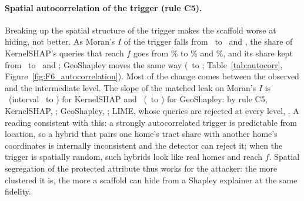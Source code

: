 \paragraph{Spatial autocorrelation of the trigger (rule C5).} Breaking up the spatial structure of the trigger makes
the scaffold worse at hiding, not better. As Moran's $I$ of the trigger falls from \AutoHighMoran\ to
\AutoMidMoran\ and \AutoLowMoran, the share of KernelSHAP's queries that reach $f$ goes from \AutoHighKernelSHAPLeak\%
to \AutoMidKernelSHAPLeak\% and \AutoLowKernelSHAPLeak\%, and its share kept from \AutoHighKernelSHAPKept\ to
\AutoMidKernelSHAPKept\ and \AutoLowKernelSHAPKept; GeoShapley moves the same way (\AutoHighGeoShapleyKept\ to
\AutoLowGeoShapleyKept; Table~\ref{tab:autocorr}, Figure~\ref{fig:F6_autocorrelation}). Most of the change comes
between the observed and the intermediate level. The slope of the matched leak on Moran's $I$ is
\SlopeMoranKernelSHAP\ (interval \SlopeMoranKernelSHAPLo\ to \SlopeMoranKernelSHAPHi) for KernelSHAP and
\SlopeMoranGeoShapley\ (\SlopeMoranGeoShapleyLo\ to \SlopeMoranGeoShapleyHi) for GeoShapley: by rule C5,
KernelSHAP, \RuleCfiveFeatureKernelSHAP; GeoShapley, \RuleCfiveFeatureGeoShapley; LIME, whose queries are rejected at
every level, \RuleCfiveFeatureLIME. A reading consistent with this: a strongly autocorrelated trigger is predictable
from location, so a hybrid that pairs one home's tract share with another home's coordinates is internally
inconsistent and the detector can reject it; when the trigger is spatially random, such hybrids look like real homes
and reach $f$. Spatial segregation of the protected attribute thus works for the attacker: the more clustered it is,
the more a scaffold can hide from a Shapley explainer at the same fidelity.

